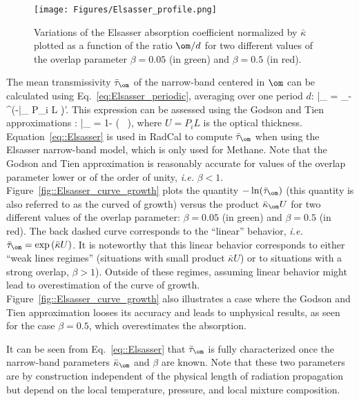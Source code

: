 \begin{figure}
\begin{center}
 \texttt{[image: Figures/Elsasser\_profile.png]}
\end{center}
 \caption{Variations of the Elsasser absorption coefficient normalized by $\bar{\kappa}$ plotted as a function of the ratio $\om/d$ for two different values of the overlap parameter $\beta = 0.05$ (in green) and $\beta = 0.5$ (in red). \label{fig:Elsasser_profile}}
\end{figure}
The mean transmissivity $\bar{\tau}_{\om}$ of the narrow-band centered in $\om$ can be calculated using Eq.~\ref{eq:Elsasser_periodic}, averaging over one period $d$:
\be
\bar{\tau}_{\om} = \displaystyle\int_{-}^{}{\exp\left(-\bar{\kappa}_{\om} P_i L \right)\d\om'}.
\ee
This expression can be assessed using the Godson and Tien approximations \cite{Brosmer1985b,Kunitomo1975}:
\be\label{eq::Elsasser}
    \bar{\tau}_{\om} = 1- \erf \left(  \,   \right),
\ee
where $U = P_iL$ is the optical thickness. Equation~\ref{eq::Elsasser} is used in RadCal to compute $\bar{\tau}_{\om}$ when using the Elsasser narrow-band model, which is only used for Methane. Note that the Godson and Tien approximation is reasonably accurate for values of the overlap parameter lower or of the order of unity, \textit{i.e.} $\beta < 1$.
Figure~\ref{fig::Elsasser_curve_growth} plots the quantity $-\ln(\bar{\tau}_{\om})$ (this quantity is also referred to as the curved of growth) versus the product $\bar{\kappa}_{\om} U$ for two different values of the overlap parameter: $\beta = 0.05$ (in green) and $\beta = 0.5$ (in red). The back dashed curve corresponds to the ``linear'' behavior, \textit{i.e.} $\bar{\tau}_{\om} = \exp\left(\bar{\kappa} U\right)$. It is noteworthy that this linear behavior corresponds to either ``weak lines regimes'' (situations with small product $\bar{\kappa} U$) or to situations with a strong overlap, $\beta > 1$). Outside of these regimes, assuming linear behavior might lead to overestimation of the curve of growth. Figure~\ref{fig::Elsasser_curve_growth} also illustrates a case where the Godson and Tien approximation looses its accuracy and leads to unphysical results, as seen for the case $\beta=0.5$, which overestimates the absorption.

It can be seen from Eq.~\ref{eq::Elsasser} that $\bar{\tau}_{\om}$ is fully characterized once the narrow-band parameters $\bar{\kappa}_{\om}$ and $\beta$ are known. Note that these two parameters are by construction independent of the physical length of radiation propagation but depend on the local temperature, pressure, and local mixture composition.

